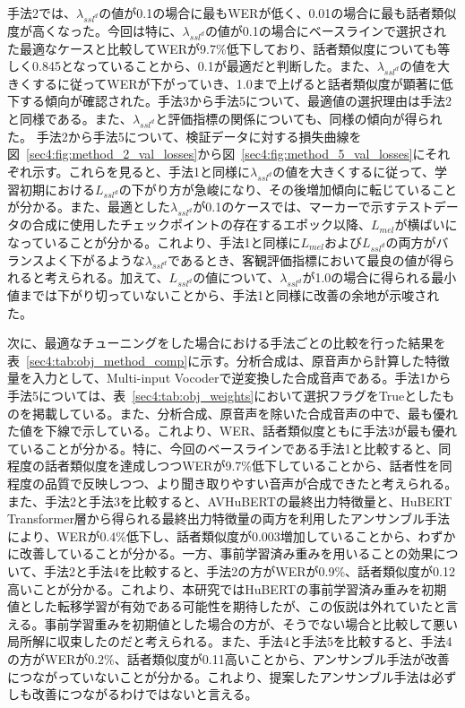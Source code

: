 \documentclass[12pt]{jarticle}
\numberwithin{equation}{section}    %
\numberwithin{figure}{section}      %
\numberwithin{table}{section}      %
\begin{document}
手法2では、$\lambda_{ssl^{d}}$の値が0.1の場合に最もWERが低く、0.01の場合に最も話者類似度が高くなった。今回は特に、$\lambda_{ssl^{d}}$の値が0.1の場合にベースラインで選択された最適なケースと比較してWERが9.7\%低下しており、話者類似度についても等しく0.845となっていることから、0.1が最適だと判断した。また、$\lambda_{ssl^{d}}$の値を大きくするに従ってWERが下がっていき、1.0まで上げると話者類似度が顕著に低下する傾向が確認された。手法3から手法5について、最適値の選択理由は手法2と同様である。また、$\lambda_{ssl^{d}}$と評価指標の関係についても、同様の傾向が得られた。
手法2から手法5について、検証データに対する損失曲線を図~\ref{sec4:fig:method_2_val_losses}から図~\ref{sec4:fig:method_5_val_losses}にそれぞれ示す。これらを見ると、手法1と同様に$\lambda_{ssl^{d}}$の値を大きくするに従って、学習初期における$L_{ssl^{d}}$の下がり方が急峻になり、その後増加傾向に転じていることが分かる。また、最適とした$\lambda_{ssl^{d}}$が0.1のケースでは、マーカーで示すテストデータの合成に使用したチェックポイントの存在するエポック以降、$L_{mel}$が横ばいになっていることが分かる。これより、手法1と同様に$L_{mel}$および$L_{ssl^{d}}$の両方がバランスよく下がるような$\lambda_{ssl^{d}}$であるとき、客観評価指標において最良の値が得られると考えられる。加えて、$L_{ssl^{d}}$の値について、$\lambda_{ssl^{d}}$が1.0の場合に得られる最小値までは下がり切っていないことから、手法1と同様に改善の余地が示唆された。

次に、最適なチューニングをした場合における手法ごとの比較を行った結果を表~\ref{sec4:tab:obj_method_comp}に示す。分析合成は、原音声から計算した特徴量を入力として、Multi-input Vocoderで逆変換した合成音声である。手法1から手法5については、表~\ref{sec4:tab:obj_weights}において選択フラグをTrueとしたものを掲載している。また、分析合成、原音声を除いた合成音声の中で、最も優れた値を下線で示している。これより、WER、話者類似度ともに手法3が最も優れていることが分かる。特に、今回のベースラインである手法1と比較すると、同程度の話者類似度を達成しつつWERが9.7\%低下していることから、話者性を同程度の品質で反映しつつ、より聞き取りやすい音声が合成できたと考えられる。
また、手法2と手法3を比較すると、AVHuBERTの最終出力特徴量と、HuBERT Transformer層から得られる最終出力特徴量の両方を利用したアンサンブル手法により、WERが0.4\%低下し、話者類似度が0.003増加していることから、わずかに改善していることが分かる。一方、事前学習済み重みを用いることの効果について、手法2と手法4を比較すると、手法2の方がWERが0.9\%、話者類似度が0.12高いことが分かる。これより、本研究ではHuBERTの事前学習済み重みを初期値とした転移学習が有効である可能性を期待したが、この仮説は外れていたと言える。事前学習重みを初期値とした場合の方が、そうでない場合と比較して悪い局所解に収束したのだと考えられる。また、手法4と手法5を比較すると、手法4の方がWERが0.2\%、話者類似度が0.11高いことから、アンサンブル手法が改善につながっていないことが分かる。これより、提案したアンサンブル手法は必ずしも改善につながるわけではないと言える。
\end{document}

